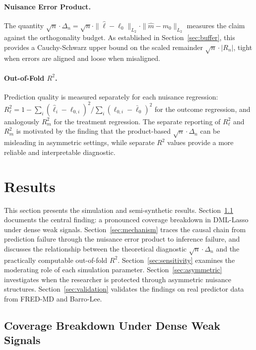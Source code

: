 \documentclass[a4paper,10.5pt]{article}
\begin{document}
\paragraph{Nuisance Error Product.} The quantity $\sqrt{n}\cdot\Delta_n = \sqrt{n} \cdot \|\hat{\ell} - \ell_0\|_{L_2} \cdot \|\hat{m} - m_0\|_{L_2}$ measures the claim against the orthogonality budget. As established in Section~\ref{sec:buffer}, this provides a Cauchy-Schwarz upper bound on the scaled remainder $\sqrt{n}\cdot|R_n|$, tight when errors are aligned and loose when misaligned.

\paragraph{Out-of-Fold $R^2$.} Prediction quality is measured separately for each nuisance regression: $R^2_\ell = 1 - \sum_i(\hat{\ell}_i - \ell_{0,i})^2 / \sum_i(\ell_{0,i} - \bar{\ell}_0)^2$ for the outcome regression, and analogously $R^2_m$ for the treatment regression. The separate reporting of $R^2_\ell$ and $R^2_m$ is motivated by the finding that the product-based $\sqrt{n}\cdot\Delta_n$ can be misleading in asymmetric settings, while separate $R^2$ values provide a more reliable and interpretable diagnostic.



\section{Results}\label{sec:results}

This section presents the simulation and semi-synthetic results. Section~\ref{sec:coverage} documents the central finding: a pronounced coverage breakdown in DML-Lasso under dense weak signals. Section~\ref{sec:mechanism} traces the causal chain from prediction failure through the nuisance error product to inference failure, and discusses the relationship between the theoretical diagnostic $\sqrt{n}\cdot\Delta_n$ and the practically computable out-of-fold $R^2$. Section~\ref{sec:sensitivity} examines the moderating role of each simulation parameter. Section~\ref{sec:asymmetric} investigates when the researcher is protected through asymmetric nuisance structures. Section~\ref{sec:validation} validates the findings on real predictor data from FRED-MD and Barro-Lee.


\subsection{Coverage Breakdown Under Dense Weak Signals}\label{sec:coverage}
\end{document}
